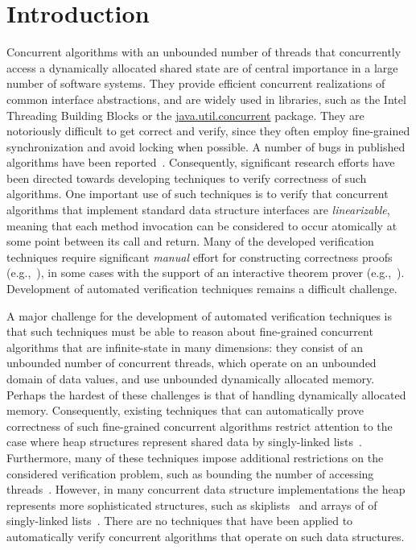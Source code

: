 \section{Introduction}



Concurrent algorithms with an unbounded number of
threads that concurrently access a dynamically allocated shared state
are of central importance in a large number of software systems.
They provide efficient concurrent realizations of
common interface abstractions, and
are widely used in libraries,
such as the Intel Threading Building Blocks or
the \url{java.util.concurrent} package.
They are notoriously difficult to get correct and verify, since they
often employ fine-grained synchronization and avoid locking when
possible. A number of bugs  in published
algorithms have been reported~\cite{DDGJLMMSS:dcas,MiSc:correction}.
Consequently, significant research efforts have been directed towards developing
techniques to verify correctness of such algorithms. One important use
of such techniques is
to verify that concurrent algorithms that implement standard data structure
interfaces are {\em linearizable}, meaning that
each method invocation can be considered to occur atomically at some point
between its call and return.
Many of the developed verification techniques require significant
{\em manual} effort for constructing correctness proofs
(e.g.,~\cite{LF:pldi13,Vafeiadis:Thesis}),
in some cases with the support of an interactive theorem prover
(e.g.,~\cite{Aaron:logical:linearizability,Colvin:Lazy-List,SDW:tcl14}).
Development of automated verification techniques remains a difficult challenge.

A major challenge for the development of automated verification techniques
is that such techniques must be
able to reason about fine-grained concurrent algorithms that are infinite-state
in many dimensions:
they consist of an unbounded number of concurrent threads, which
operate on an unbounded domain of data values, and use
unbounded dynamically allocated memory. 
Perhaps the hardest of these challenges is that of handling 
dynamically allocated memory.
Consequently, existing techniques that can automatically prove correctness
of such fine-grained concurrent algorithms restrict attention to the
case where heap structures represent shared data by singly-linked 
lists~\cite{AHHR:integrated,meyer:vmcai16,Quy:sas16,Sagiv:correlation,Vafeiadis:cav10}. Furthermore, many of these techniques impose additional restrictions on the considered verification problem, such as bounding the number of accessing
threads~\cite{Amit:comparisonAbstraction,Vechev:spin09,CernyRZCA:CAV10}.
However, in many concurrent data structure implementations the heap represents
more sophisticated structures, such as 
skiplists~\cite{Fomitchev:2004,ArtOfMpP,Sundell:2005} and arrays of
of singly-linked lists~\cite{ts-stack}. There are no
techniques that have been applied to automatically verify concurrent algorithms
that operate on such data structures.

